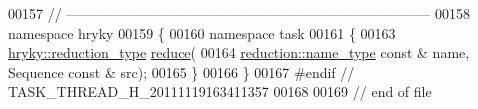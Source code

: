 \begin{DoxyCode}
00157 \textcolor{comment}{//
      ------------------------------------------------------------------------------}
00158 \textcolor{keyword}{namespace }hryky
00159 \{
00160 \textcolor{keyword}{namespace }task
00161 \{
00163     \hyperlink{classhryky_1_1_intrusive_ptr}{hryky::reduction_type} \hyperlink{namespacehryky_1_1task_a3cd1766998ce63e0a3886c8a3abd02ca}{reduce}(
00164         \hyperlink{namespacehryky_1_1reduction_ac686c30a4c8d196bbd0f05629a6b921f}{reduction::name_type} \textcolor{keyword}{const} & name, Sequence \textcolor{keyword}{const} & src);
00165 \}
00166 \}
00167 \textcolor{preprocessor}{#endif // TASK\_THREAD\_H\_20111119163411357}
00168 \textcolor{preprocessor}{}
00169 \textcolor{comment}{// end of file}
\end{DoxyCode}
